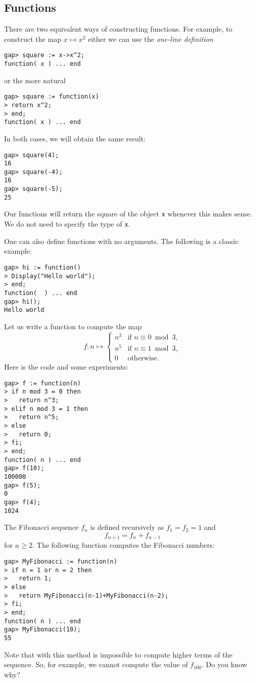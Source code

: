 \subsection{Functions}

There are two equivalent ways of constructing functions. For example, to
construct the map $x\mapsto x^2$ either we can use the \emph{one-line definition}
\begin{lstlisting}
gap> square := x->x^2;
function( x ) ... end
\end{lstlisting}
or the more natural 
\begin{lstlisting}
gap> square := function(x)
> return x^2;
> end;
function( x ) ... end
\end{lstlisting}
In both cases, we will obtain the same result:
\begin{lstlisting}
gap> square(4);
16
gap> square(-4);
16
gap> square(-5);
25
\end{lstlisting}

\begin{remark}
Our functions will return the square of the object \lstinline{x} whenever this makes sense. We do not 
need to specify the type of \lstinline{x}.  
\end{remark}

One can also define functions with no arguments. 
The following is a classic example:
\begin{lstlisting}
gap> hi := function()
> Display("Hello world");
> end;
function(  ) ... end
gap> hi();
Hello world
\end{lstlisting}

\begin{example}
\label{exa:function}
Let us write a function to compute the map 
\[
f\colon n\mapsto\begin{cases}
	n^3 & \text{if $n\equiv0\bmod 3$},\\
	n^5 & \text{if $n\equiv1\bmod 3$},\\
	0 & \text{otherwise.}
\end{cases}
\]
Here is the code and some experiments:
\begin{lstlisting}
gap> f := function(n)
> if n mod 3 = 0 then
>   return n^3;
> elif n mod 3 = 1 then
>   return n^5;
> else
>   return 0;
> fi;
> end;
function( n ) ... end
gap> f(10);
100000
gap> f(5);
0
gap> f(4);
1024
\end{lstlisting}
\end{example}

\begin{example}
\label{exa:Fibonacci:1}
The Fibonacci sequence $f_n$ is defined recursively as $f_1=f_2=1$ and 
\[
f_{n+1}=f_n+f_{n-1}
\]
for $n\geq2$. The following function computes the Fibonacci numbers:
\begin{lstlisting}
gap> MyFibonacci := function(n)
> if n = 1 or n = 2 then
>   return 1;
> else
>   return MyFibonacci(n-1)+MyFibonacci(n-2);
> fi;
> end;
function( n ) ... end
gap> MyFibonacci(10);
55
\end{lstlisting}
Note that with this method is impossible to compute higher terms 
of the sequence. So, for example, we cannot compute 
the value of $f_{100}$. Do you know why?
\end{example}

